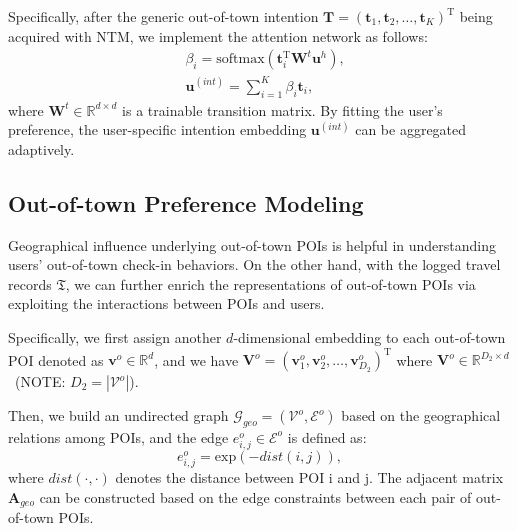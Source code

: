 \documentclass[letterpaper]{article} %
\begin{document}
Specifically, after the generic out-of-town intention
$\mathbf{T} =
\left(
{\mathbf{t}_1,\mathbf{t}_2,\ldots,\mathbf{t}_{K}}
\right)^{\mathrm{T}}$ being acquired with NTM, we implement the attention network as follows:
\begin{equation}\label{e:intention_embedding}
    \begin{split}
        & \beta_i = \mathrm{softmax}\left(
        \mathbf{t}_i^\mathrm{T}
        \mathbf{W}^t
        \mathbf{u}^h
        \right)  ,
        \\
        & \mathbf{u}^{(int)} = \sum_{i=1}^{K}
        \beta_i \mathbf{t}_i  ,
    \end{split}
\end{equation}
where $\mathbf{W}^t \in \mathbb{R}^{d \times d}$ is a trainable transition matrix.
By fitting the user's preference, the {user-specific} intention embedding $\mathbf{u}^{(int)}$ can be aggregated adaptively.


\subsection{Out-of-town Preference Modeling}
Geographical influence underlying out-of-town POIs is helpful in understanding users' out-of-town check-in behaviors.
On the other hand, with the logged travel records $ \mathfrak{T} $, we can further enrich the representations of out-of-town POIs via exploiting the interactions between POIs and users.

Specifically,
we first assign another $d$-dimensional embedding to each out-of-town POI denoted as $\mathbf{v}^o \in \mathbb{R}^d$,
and we have $\mathbf{V}^o = {\left(\mathbf{v}^o_1, \mathbf{v}^o_2, \ldots, \mathbf{v}^o_{D_2}\right)}^{\mathrm{T}}$
where
$\mathbf{V}^o \in \mathbb{R}^{D_2 \times d}$~(NOTE: $D_2 = |\mathcal{V}^o|$).


Then, we build an undirected graph $\mathcal{G}_{geo} = (\mathcal{V}^o, \mathcal{E}^o)$ based on the geographical relations among POIs,
and the edge $ e^o_{i, j} \in \mathcal{E}^o$ is defined as:
\begin{equation}\label{e:geo_graph_edge}
    e^o_{i, j} = \mathrm{exp} \left({- dist(i,j)}\right) ,
\end{equation}
where $dist(\cdot,\cdot)$ denotes the distance between POI i and j.
The adjacent matrix $\mathbf{A}_{geo}$ can be constructed based on the edge constraints between each pair of out-of-town POIs.
\end{document}
